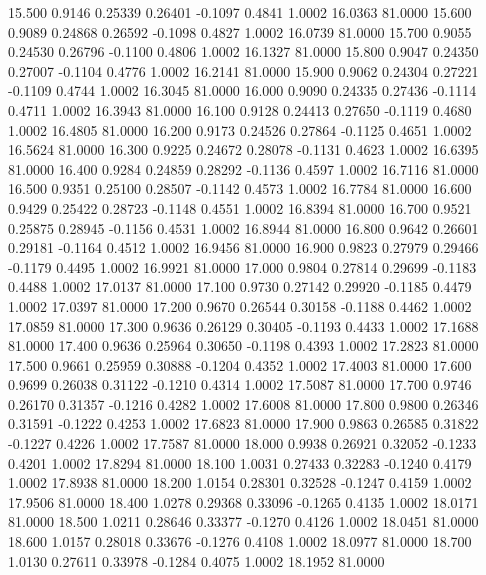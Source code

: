   15.500   0.9146   0.25339   0.26401  -0.1097   0.4841   1.0002  16.0363  81.0000
  15.600   0.9089   0.24868   0.26592  -0.1098   0.4827   1.0002  16.0739  81.0000
  15.700   0.9055   0.24530   0.26796  -0.1100   0.4806   1.0002  16.1327  81.0000
  15.800   0.9047   0.24350   0.27007  -0.1104   0.4776   1.0002  16.2141  81.0000
  15.900   0.9062   0.24304   0.27221  -0.1109   0.4744   1.0002  16.3045  81.0000
  16.000   0.9090   0.24335   0.27436  -0.1114   0.4711   1.0002  16.3943  81.0000
  16.100   0.9128   0.24413   0.27650  -0.1119   0.4680   1.0002  16.4805  81.0000
  16.200   0.9173   0.24526   0.27864  -0.1125   0.4651   1.0002  16.5624  81.0000
  16.300   0.9225   0.24672   0.28078  -0.1131   0.4623   1.0002  16.6395  81.0000
  16.400   0.9284   0.24859   0.28292  -0.1136   0.4597   1.0002  16.7116  81.0000
  16.500   0.9351   0.25100   0.28507  -0.1142   0.4573   1.0002  16.7784  81.0000
  16.600   0.9429   0.25422   0.28723  -0.1148   0.4551   1.0002  16.8394  81.0000
  16.700   0.9521   0.25875   0.28945  -0.1156   0.4531   1.0002  16.8944  81.0000
  16.800   0.9642   0.26601   0.29181  -0.1164   0.4512   1.0002  16.9456  81.0000
  16.900   0.9823   0.27979   0.29466  -0.1179   0.4495   1.0002  16.9921  81.0000
  17.000   0.9804   0.27814   0.29699  -0.1183   0.4488   1.0002  17.0137  81.0000
  17.100   0.9730   0.27142   0.29920  -0.1185   0.4479   1.0002  17.0397  81.0000
  17.200   0.9670   0.26544   0.30158  -0.1188   0.4462   1.0002  17.0859  81.0000
  17.300   0.9636   0.26129   0.30405  -0.1193   0.4433   1.0002  17.1688  81.0000
  17.400   0.9636   0.25964   0.30650  -0.1198   0.4393   1.0002  17.2823  81.0000
  17.500   0.9661   0.25959   0.30888  -0.1204   0.4352   1.0002  17.4003  81.0000
  17.600   0.9699   0.26038   0.31122  -0.1210   0.4314   1.0002  17.5087  81.0000
  17.700   0.9746   0.26170   0.31357  -0.1216   0.4282   1.0002  17.6008  81.0000
  17.800   0.9800   0.26346   0.31591  -0.1222   0.4253   1.0002  17.6823  81.0000
  17.900   0.9863   0.26585   0.31822  -0.1227   0.4226   1.0002  17.7587  81.0000
  18.000   0.9938   0.26921   0.32052  -0.1233   0.4201   1.0002  17.8294  81.0000
  18.100   1.0031   0.27433   0.32283  -0.1240   0.4179   1.0002  17.8938  81.0000
  18.200   1.0154   0.28301   0.32528  -0.1247   0.4159   1.0002  17.9506  81.0000
  18.400   1.0278   0.29368   0.33096  -0.1265   0.4135   1.0002  18.0171  81.0000
  18.500   1.0211   0.28646   0.33377  -0.1270   0.4126   1.0002  18.0451  81.0000
  18.600   1.0157   0.28018   0.33676  -0.1276   0.4108   1.0002  18.0977  81.0000
  18.700   1.0130   0.27611   0.33978  -0.1284   0.4075   1.0002  18.1952  81.0000
